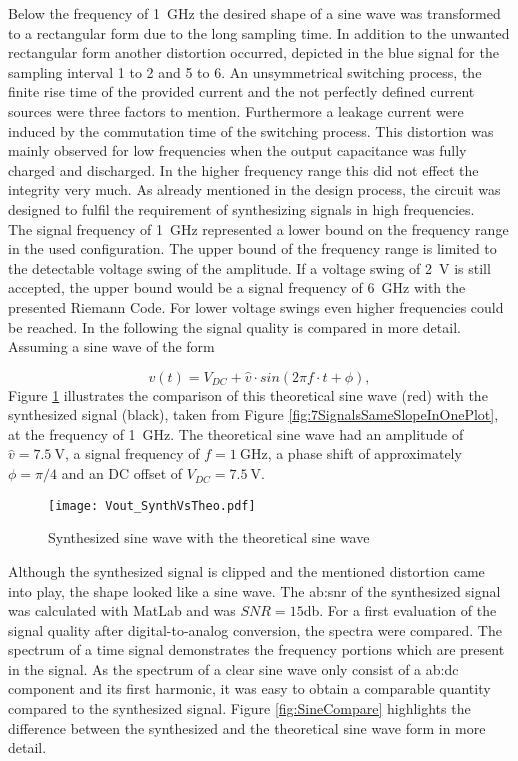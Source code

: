 Below the frequency of \SI{1}{\GHz} the desired shape of a sine wave was transformed to a rectangular  form due to the long sampling time.
In addition to the unwanted rectangular form another distortion occurred, depicted in the blue signal for the sampling interval 1 to 2 and 5 to 6.
An unsymmetrical switching process, the finite rise time of the provided current and the not perfectly defined current sources were three factors to mention. %
Furthermore a leakage current were induced by the commutation time of the switching process.
This distortion was mainly observed for low frequencies when the output capacitance was fully charged and discharged.
In the higher frequency range this did not effect the integrity very much.
As already mentioned in the design process, the circuit was designed to fulfil the requirement of synthesizing signals in high frequencies.\\
The signal frequency of \SI{1}{\giga \hertz} represented a lower bound on the frequency range in the used configuration. %
The upper bound of the frequency range is limited to the detectable voltage swing of the amplitude.
If a voltage swing of \SI{2}{\volt} is still accepted, the upper bound would be a signal frequency of \SI{6}{\GHz} with the presented Riemann Code.
For lower voltage swings even higher frequencies could be reached.
In the following the signal quality is compared in more detail.
Assuming a sine wave of the form

\begin{equation}
	v(t)= V_{DC} + \widehat{v} \cdot sin( 2  \pi  f \cdot  t + \phi),
\end{equation}
Figure \ref{fig:SineWaveSynthVsTheoretical} illustrates the comparison of this theoretical sine wave (red) with the synthesized signal (black), taken from Figure \ref{fig:7SignalsSameSlopeInOnePlot}, at the frequency of \SI{1}{\GHz}.
The theoretical sine wave had an amplitude of $\widehat{v} = \SI{7.5}{\volt}$, a signal frequency of $f = \SI{1}{\giga \hertz}$, a phase shift of approximately $\phi = \pi / 4$ and an DC offset of $V_{DC} = \SI{7.5}{\volt}$.


\begin{figure}[htb!]
   \centering
   \texttt{[image: Vout\_SynthVsTheo.pdf]}
   \caption{Synthesized sine wave with the theoretical sine wave}
   \label{fig:SineWaveSynthVsTheoretical}
\end{figure}
Although the synthesized signal is clipped and the mentioned distortion came into play, the shape looked like a sine wave.
The \gls{ab:snr} of the synthesized signal was calculated with MatLab and was $SNR = 15$\si{\decibel}.
For a first evaluation of the signal quality after digital-to-analog conversion, the spectra were compared.
The spectrum of a time signal demonstrates the frequency portions which are present in the signal.
As the spectrum of a clear sine wave only consist of a \gls{ab:dc} component and its first harmonic, it was easy to obtain a comparable quantity compared to the synthesized signal.
Figure \ref{fig:SineCompare} highlights the difference between the synthesized and the theoretical sine wave form in more detail.

